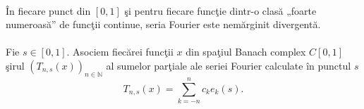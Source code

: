 \documentclass[a4paper,openany,12pt]{report}
\begin{document}
\paragraph*{}\^ In fiecare punct din $[0,1]$ \c si pentru fiecare func\c tie dintr-o clas\u a „foarte numeroas\u a” de func\c tii continue, seria Fourier este nem\u arginit divergent\u a.
\paragraph*{}Fie $s\in[0,1]$. Asociem fiec\u arei func\c tii $x$ din spa\c tiul Banach complex $C[0,1]$ \c sirul $(T_{n,s}(x))_{n\in \mathbb{N}}$ al sumelor par\c tiale ale seriei Fourier calculate \^ in punctul $s$
\begin{equation*}
T_{n,s}(x)= \sum_{k=-n}^{n}c_ke_k(s).
\end{equation*}
\end{document}
